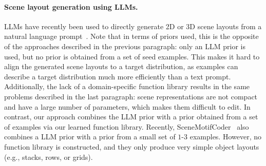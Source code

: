 \paragraph{Scene layout generation using LLMs.}
LLMs have recently been used to directly generate 2D or 3D scene layouts from a natural language prompt~\cite{yang2024holodeck, feng2023layoutgpt, zhang2024scene, littlefair2025flairgpt, hu2024scenecraft, aguina2024open}. Note that in terms of priors used, this is the opposite of the approaches described in the previous paragraph: only an LLM prior is used, but no prior is obtained from a set of seed examples. 
This makes it hard to align the generated scene layouts to a target distribution, as examples can describe a target distribution much more efficiently than a text prompt. Additionally, the lack of a domain-specific function library results in the same problems described in the last paragraph: scene representations are not compact and have a large number of parameters, which makes them difficult to edit. 
In contrast, our approach combines the LLM prior with a prior obtained from a set of examples via our learned function library.
Recently, SceneMotifCoder~\cite{tam2024scenemotifcoder} also combines a LLM prior with a prior from a small set of $1$-$3$ examples. However, no function library is constructed, and they only produce very simple object layouts (e.g.,  stacks, rows, or grids).